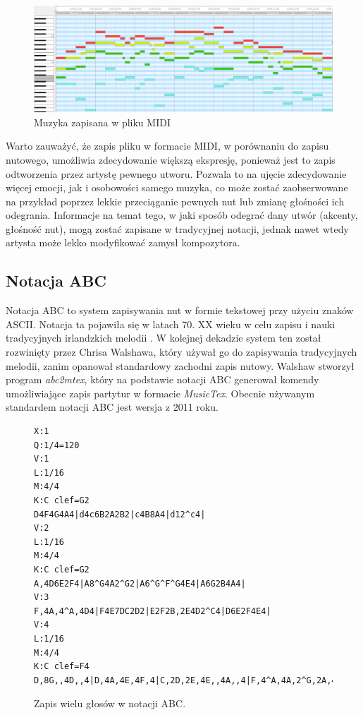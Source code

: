 \documentclass[data-science]{agh-wi} %
\begin{document}
\begin{figure}[ht!]
    \begin{center}
        \includegraphics*[width=\linewidth]{./img/piano_roll.png}
    \end{center}
    \caption{Muzyka zapisana w pliku MIDI}\label{fig:jsb_pianoroll}
\end{figure}

Warto zauważyć, że zapis pliku w formacie MIDI, w porównaniu do zapisu nutowego, umożliwia zdecydowanie większą ekspresję, ponieważ jest to zapis odtworzenia przez artystę pewnego utworu. Pozwala to na ujęcie zdecydowanie więcej emocji, jak i osobowości samego muzyka, co może zostać zaobserwowane na przykład poprzez lekkie przeciąganie pewnych nut lub zmianę głośności ich odegrania. Informacje na temat tego, w jaki sposób odegrać dany utwór (akcenty, głośność nut), mogą zostać zapisane w tradycyjnej notacji, jednak nawet wtedy artysta może lekko modyfikować zamysł kompozytora.

\subsection{Notacja ABC}
Notacja ABC to system zapisywania nut w formie tekstowej przy użyciu znaków ASCII. Notacja ta pojawiła się w latach 70. XX wieku w celu zapisu i nauki tradycyjnych irlandzkich melodii \cite{abc_history}. W kolejnej dekadzie system ten został rozwinięty przez Chrisa Walshawa, który używał go do zapisywania tradycyjnych melodii, zanim opanował standardowy zachodni zapis nutowy. Walshaw stworzył program \textit{abc2mtex}, który na podstawie notacji ABC generował komendy umożliwiające zapis partytur w formacie \textit{MusicTex}. Obecnie używanym standardem notacji ABC jest wersja z 2011 roku.

\begin{figure}[ht!]
    \begin{verbatim}
X:1
Q:1/4=120
V:1
L:1/16
M:4/4
K:C clef=G2
D4F4G4A4|d4c6B2A2B2|c4B8A4|d12^c4|
V:2
L:1/16
M:4/4
K:C clef=G2
A,4D6E2F4|A8^G4A2^G2|A6^G^F^G4E4|A6G2B4A4|
V:3
F,4A,4^A,4D4|F4E7DC2D2|E2F2B,2E4D2^C4|D6E2F4E4|
V:4
L:1/16
M:4/4
K:C clef=F4
D,8G,,4D,,4|D,4A,4E,4F,4|C,2D,2E,4E,,4A,,4|F,4^A,4A,2^G,2A,4|        
\end{verbatim}
    \caption{Zapis wielu głosów w notacji ABC.}\label{fig:abc_polyphony}
\end{figure}
\end{document}
